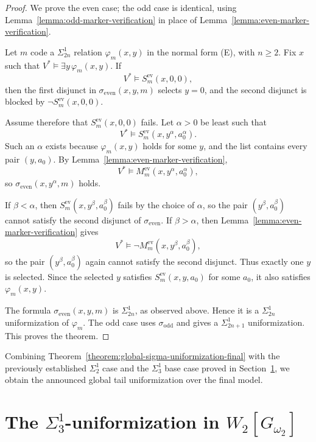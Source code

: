 \documentclass[a4paper,11pt]{article}
\begin{document}
\begin{proof}
We prove the even case; the odd case is identical, using Lemma~\ref{lemma:odd-marker-verification} in place of Lemma~\ref{lemma:even-marker-verification}.

Let $m$ code a $\Sigma^1_{2n}$ relation $\varphi_m(x,y)$ in the normal form (E), with $n\geq 2$.  Fix $x$ such that $V^*\models\exists y\,\varphi_m(x,y)$.  If
\[
V^*\models S^{\mathrm{ev}}_m(x,0,0),
\]
then the first disjunct in $\sigma_{\mathrm{even}}(x,y,m)$ selects $y=0$, and the second disjunct is blocked by $\neg S^{\mathrm{ev}}_m(x,0,0)$.

Assume therefore that $S^{\mathrm{ev}}_m(x,0,0)$ fails.  Let $\alpha>0$ be least such that
\[
V^*\models S^{\mathrm{ev}}_m(x,y^\alpha,a_0^\alpha).
\]
Such an $\alpha$ exists because $\varphi_m(x,y)$ holds for some $y$, and the list contains every pair $(y,a_0)$.  By Lemma~\ref{lemma:even-marker-verification},
\[
V^*\models M^{\mathrm{ev}}_m(x,y^\alpha,a_0^\alpha),
\]
so $\sigma_{\mathrm{even}}(x,y^\alpha,m)$ holds.

If $\beta<\alpha$, then $S^{\mathrm{ev}}_m(x,y^\beta,a_0^\beta)$ fails by the choice of $\alpha$, so the pair $(y^\beta,a_0^\beta)$ cannot satisfy the second disjunct of $\sigma_{\mathrm{even}}$.  If $\beta>\alpha$, then Lemma~\ref{lemma:even-marker-verification} gives
\[
V^*\models\neg M^{\mathrm{ev}}_m(x,y^\beta,a_0^\beta),
\]
so the pair $(y^\beta,a_0^\beta)$ again cannot satisfy the second disjunct.  Thus exactly one $y$ is selected.  Since the selected $y$ satisfies $S^{\mathrm{ev}}_m(x,y,a_0)$ for some $a_0$, it also satisfies $\varphi_m(x,y)$.

The formula $\sigma_{\mathrm{even}}(x,y,m)$ is $\Sigma^1_{2n}$, as observed above.  Hence it is a $\Sigma^1_{2n}$ uniformization of $\varphi_m$.  The odd case uses $\sigma_{\mathrm{odd}}$ and gives a $\Sigma^1_{2n+1}$ uniformization.  This proves the theorem.
\end{proof}

Combining Theorem~\ref{theorem:global-sigma-uniformization-final} with the previously established $\Sigma^1_2$ case and the $\Sigma^1_3$ base case proved in Section~\ref{sec:sigma13-uniformization}, we obtain the announced global tail uniformization over the final model.



\section{The $\Sigma^1_3$-uniformization in $W_{2}[G_{\omega_2}]$}\label{sec:sigma13-uniformization}
\end{document}
